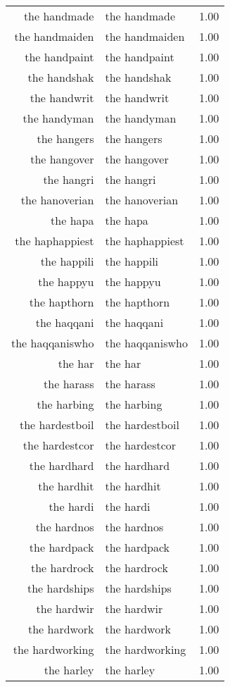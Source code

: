 \begin{table}[ht]
\begin{tabular}{rlr}
  the handmade & the handmade & 1.00 \\ 
  the handmaiden & the handmaiden & 1.00 \\ 
  the handpaint & the handpaint & 1.00 \\ 
  the handshak & the handshak & 1.00 \\ 
  the handwrit & the handwrit & 1.00 \\ 
  the handyman & the handyman & 1.00 \\ 
  the hangers & the hangers & 1.00 \\ 
  the hangover & the hangover & 1.00 \\ 
  the hangri & the hangri & 1.00 \\ 
  the hanoverian & the hanoverian & 1.00 \\ 
  the hapa & the hapa & 1.00 \\ 
  the haphappiest & the haphappiest & 1.00 \\ 
  the happili & the happili & 1.00 \\ 
  the happyu & the happyu & 1.00 \\ 
  the hapthorn & the hapthorn & 1.00 \\ 
  the haqqani & the haqqani & 1.00 \\ 
  the haqqaniswho & the haqqaniswho & 1.00 \\ 
  the har & the har & 1.00 \\ 
  the harass & the harass & 1.00 \\ 
  the harbing & the harbing & 1.00 \\ 
  the hardestboil & the hardestboil & 1.00 \\ 
  the hardestcor & the hardestcor & 1.00 \\ 
  the hardhard & the hardhard & 1.00 \\ 
  the hardhit & the hardhit & 1.00 \\ 
  the hardi & the hardi & 1.00 \\ 
  the hardnos & the hardnos & 1.00 \\ 
  the hardpack & the hardpack & 1.00 \\ 
  the hardrock & the hardrock & 1.00 \\ 
  the hardships & the hardships & 1.00 \\ 
  the hardwir & the hardwir & 1.00 \\ 
  the hardwork & the hardwork & 1.00 \\ 
  the hardworking & the hardworking & 1.00 \\ 
  the harley & the harley & 1.00 \\ 

\end{tabular}
\end{table}
